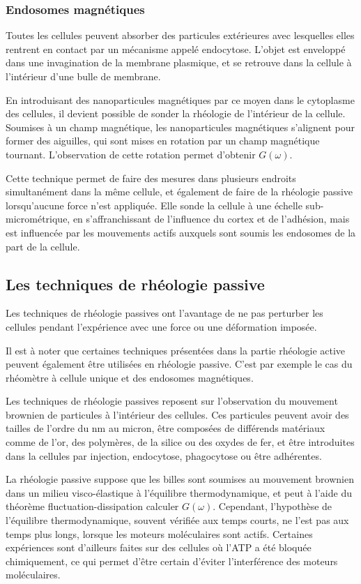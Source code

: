 \documentclass{report}
\begin{document}
\subsubsection{Endosomes magnétiques}

Toutes les cellules peuvent absorber des particules extérieures avec lesquelles elles rentrent en contact par un mécanisme appelé endocytose. L'objet est enveloppé dans une invagination de la membrane plasmique, et se retrouve dans la cellule à l'intérieur d'une bulle de membrane. 

En introduisant des nanoparticules magnétiques par ce moyen dans le cytoplasme des cellules, il devient possible de sonder la rhéologie de l'intérieur de la cellule. 
Soumises à un champ magnétique, les nanoparticules magnétiques s'alignent pour former des aiguilles, qui sont mises en rotation par un champ magnétique tournant. 
L'observation de cette rotation permet d'obtenir $G(\omega)$. 

Cette technique permet de faire des mesures dans plusieurs endroits  simultanément dans la même cellule, et également de faire de la rhéologie passive lorsqu'aucune force n'est appliquée. Elle sonde la cellule à une échelle sub-micrométrique, en s'affranchissant de l'influence du cortex et de l'adhésion, mais est influencée par les mouvements actifs auxquels sont soumis les endosomes de la part de la cellule. 

\subsection{Les techniques de rhéologie passive}
Les techniques de rhéologie passives ont l'avantage de ne pas perturber les cellules pendant l'expérience avec une force ou une déformation imposée. 

Il est à noter que certaines techniques présentées dans la partie rhéologie active peuvent également être utilisées en rhéologie passive. C'est par exemple le cas du rhéomètre à cellule unique et des endosomes magnétiques. 

Les techniques de rhéologie passives reposent sur l'observation du mouvement brownien de particules à l'intérieur des cellules. Ces particules peuvent avoir des tailles de l'ordre du nm au micron, être composées de différends matériaux comme de l'or, des polymères, de la silice ou des oxydes de fer, et être introduites dans la cellules par injection, endocytose, phagocytose ou être adhérentes. 

La rhéologie passive suppose que les billes sont soumises au mouvement brownien dans un milieu visco-élastique à l'équilibre thermodynamique, et peut à l'aide du théorème fluctuation-dissipation calculer $G(\omega)$. 
Cependant, l'hypothèse de l'équilibre thermodynamique, souvent vérifiée aux temps courts, ne l'est pas aux temps plus longs, lorsque les moteurs moléculaires sont actifs. 
Certaines expériences sont d'ailleurs faites sur des cellules où l'ATP a été bloquée chimiquement, ce qui permet d'être certain d'éviter l'interférence des moteurs moléculaires. 
\end{document}
